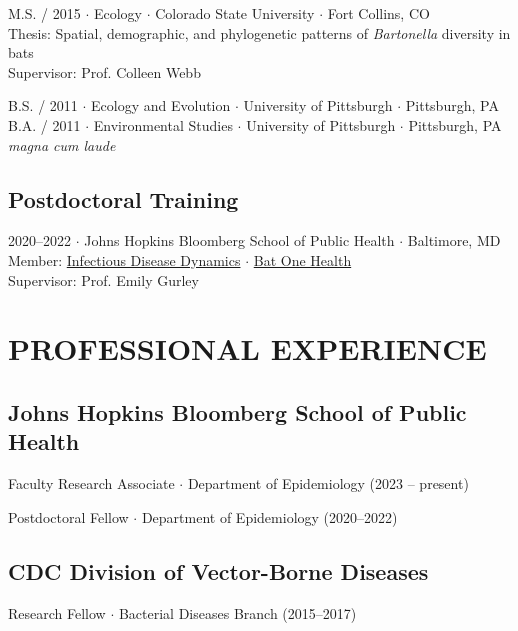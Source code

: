 \documentclass{cv}
\begin{document}
M.S. / 2015 $\cdot$ Ecology $\cdot$ Colorado State University $\cdot$ Fort Collins, CO \\
Thesis: Spatial, demographic, and phylogenetic patterns of \textit{Bartonella} diversity in bats \\
Supervisor: Prof. Colleen Webb

B.S. / 2011 $\cdot$ Ecology and Evolution $\cdot$ University of Pittsburgh $\cdot$ Pittsburgh, PA \\
B.A. / 2011 $\cdot$ Environmental Studies $\cdot$ University of Pittsburgh $\cdot$ Pittsburgh, PA \\
\textit{magna cum laude}

\subsection*{Postdoctoral Training}

2020--2022 $\cdot$ Johns Hopkins Bloomberg School of Public Health $\cdot$ Baltimore, MD \\
Member: \href{http://www.iddynamics.jhsph.edu/}{Infectious Disease Dynamics} $\cdot$ \href{https://batonehealth.org/}{Bat One Health} \\
Supervisor: Prof. Emily Gurley


\section*{PROFESSIONAL EXPERIENCE}

\subsection*{Johns Hopkins Bloomberg School of Public Health}

Faculty Research Associate $\cdot$ Department of Epidemiology (2023 -- present)

Postdoctoral Fellow $\cdot$ Department of Epidemiology (2020--2022)

\subsection*{CDC Division of Vector-Borne Diseases}

Research Fellow $\cdot$ Bacterial Diseases Branch (2015--2017)
\end{document}
